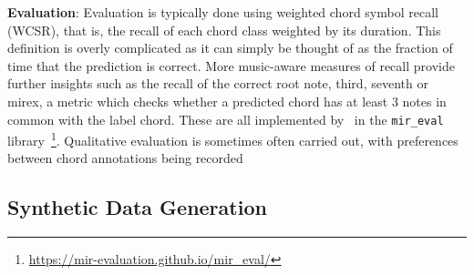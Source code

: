 \textbf{Evaluation}: Evaluation is typically done using weighted chord symbol recall (WCSR), that is, the recall of each chord class weighted by its duration. This definition is overly complicated as it can simply be thought of as the fraction of time that the prediction is correct. More music-aware measures of recall provide further insights such as the recall of the correct root note, third, seventh or mirex, a metric which checks whether a predicted chord has at least 3 notes in common with the label chord. These are all implemented by~\citet{mir_eval} in the \texttt{mir\_eval} library~\footnote{\url{https://mir-evaluation.github.io/mir_eval/}}. Qualitative evaluation is sometimes often carried out, with preferences between chord annotations being recorded





\subsection{Synthetic Data Generation} 